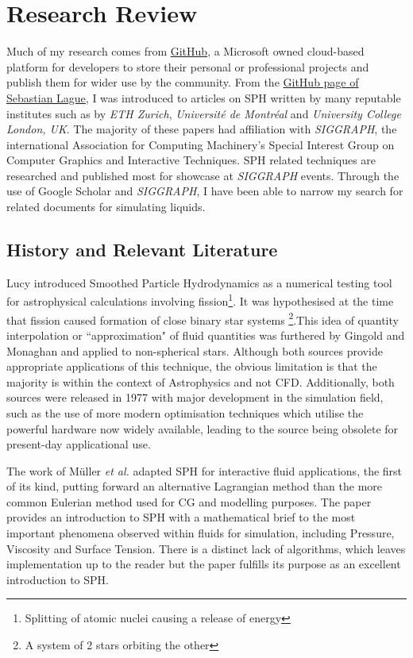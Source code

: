 \documentclass[write-up.tex]{subfiles}
\begin{document}
\section{Research Review}
Much of my research comes from \href{https://www.github.com}{GitHub}, a Microsoft owned cloud-based platform for developers to store their personal or professional projects and publish them for wider use by the community. From the \href{https://github.com/SebLague/Fluid-Sim}{GitHub page of Sebastian Lague}, I was introduced to articles on SPH written by many reputable institutes such as by \textit{ETH Zurich}, \textit{Université de Montréal} and \textit{University College London, UK}. The majority of these papers had affiliation with \textit{SIGGRAPH}, the international Association for Computing Machinery's Special Interest Group on Computer Graphics and Interactive Techniques. SPH related techniques are researched and published most for showcase at \textit{SIGGRAPH} events. Through the use of Google Scholar and \textit{SIGGRAPH}, I have been able to narrow my search for related documents for simulating liquids.
\subsection{History and Relevant Literature}
Lucy \cite{lucy} introduced Smoothed Particle Hydrodynamics as a numerical testing tool for astrophysical calculations involving fission\footnote{Splitting of atomic nuclei causing a release of energy}. It was hypothesised at the time that fission caused formation of close binary star systems \footnote{A system of 2 stars orbiting the other}.This idea of quantity interpolation or ``approximation" of fluid quantities was furthered by Gingold and Monaghan \cite{gingold} and applied to non-spherical stars. Although both sources provide appropriate applications of this technique, the obvious limitation is that the majority is within the context of Astrophysics and not CFD. Additionally, both sources were released in 1977 with major development in the simulation field, such as the use of more modern optimisation techniques which utilise the powerful hardware now widely available, leading to the source being obsolete for present-day applicational use.

The work of Müller \textit{et al.} \cite{muller} adapted SPH for interactive fluid applications, the first of its kind, putting forward an alternative Lagrangian method than the more common Eulerian method used for CG and modelling purposes. The paper provides an introduction to SPH with a mathematical brief to the most important phenomena observed within fluids for simulation, including Pressure, Viscosity and Surface Tension. There is a distinct lack of algorithms, which leaves implementation up to the reader but the paper fulfills its purpose as an excellent introduction to SPH.
\end{document}
